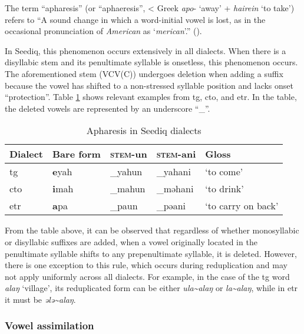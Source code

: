 The term ``apharesis'' (or ``aphaeresis'', < Greek \textit{apo}- `away' + \textit{hairein} `to take') refers to ``A sound change in which a word-initial vowel is lost, as in the occasional pronunciation of \textit{American} as `\textit{merican}'.'' (\cite[13]{campbell2007HLglossary}).

In Seediq, this phenomenon occurs extensively in all dialects. When there is a disyllabic stem and its penultimate syllable is onsetless, this phenomenon occurs. The aforementioned stem (VCV(C)) undergoes deletion when adding a suffix because the vowel has shifted to a non-stressed syllable position and lacks onset ``protection''. Table \ref{tab:apharesis} shows relevant examples from \acl{tg}, \acl{cto}, and \acl{etr}. In the table, the deleted vowels are represented by an underscore ``\_''.

\begin{table}[!htbp]
\centering
\caption{Apharesis in Seediq dialects}
\label{tab:apharesis}
\begin{tabular}{lllll}
\hline
Dialect   & Bare form & \textsc{stem}-un & \textsc{stem}-ani & Gloss              \\ \hline
\acl{tg}  & \textbf{e}yah      & \_yahun          & \_yahani          & `to come'          \\
\acl{cto} & \textbf{i}mah      & \_mahun          & \_məhani          & `to drink'         \\
\acl{etr} & \textbf{a}pa       & \_paun           & \_pəani           & `to carry on back' \\ \hline
\end{tabular}
\end{table}

From the table above, it can be observed that regardless of whether monosyllabic or disyllabic suffixes are added, when a vowel originally located in the penultimate syllable shifts to any prepenultimate syllable, it is deleted. However, there is one exception to this rule, which occurs during reduplication and may not apply uniformly across all dialects. For example, in the case of the \acl{tg} word \textit{alaŋ} `village', its reduplicated form can be either \textit{ula\~{}alaŋ} or \textit{la\~{}alaŋ}, while in \acl{etr} it must be \textit{ələ\~{}alaŋ}.


\subsubsection{Vowel assimilation} \label{sec:vassim}

